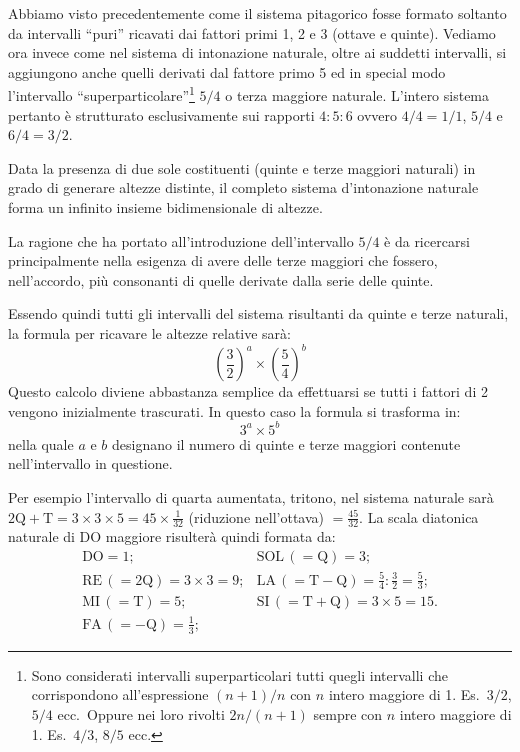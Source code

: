 Abbiamo visto precedentemente come il sistema pitagorico fosse formato
soltanto da intervalli ``puri'' ricavati dai fattori primi 1, 2 e 3 (ottave e
quinte). Vediamo ora invece come nel sistema di intonazione naturale, oltre ai
suddetti intervalli, si aggiungono anche quelli derivati dal fattore primo 5
ed in special modo l'intervallo ``superparticolare''\footnote{\label{nota:superpart}Sono
considerati intervalli superparticolari tutti quegli intervalli che
corrispondono all'espressione $(n+1)/n$ con $n$ intero maggiore di 1.
Es.\ $3/2$, $5/4$ ecc.\ Oppure nei loro rivolti $2n/(n+1)$ sempre con $n$
intero maggiore di 1. Es.\ $4/3$, $8/5$ ecc.} $5/4$ o terza maggiore naturale.
L'intero sistema pertanto è strutturato esclusivamente sui rapporti $4:5:6$
ovvero $4/4 = 1/1$, $5/4$ e $6/4 = 3/2$.

Data la presenza di due sole costituenti (quinte e terze maggiori naturali) in
grado di generare altezze distinte, il completo sistema d'intonazione naturale
forma un infinito insieme bidimensionale di altezze.

La ragione che ha portato all'introduzione dell'intervallo $5/4$ è da
ricercarsi principalmente nella esigenza di avere delle terze maggiori che
fossero, nell'accordo, più consonanti di quelle derivate dalla serie delle
quinte.

Essendo quindi tutti gli intervalli del sistema risultanti da quinte e terze
naturali, la formula per ricavare le altezze relative sarà:
\[
  \left(\frac{3}{2}\right)^{a} \times \left(\frac{5}{4}\right)^{b}
\]
Questo calcolo diviene abbastanza semplice da effettuarsi se tutti i fattori di
2 vengono inizialmente trascurati. In questo caso la formula si trasforma in:
\[
  3^{a} \times 5^{b}
\]
nella quale $a$ e $b$ designano il numero di quinte e terze maggiori contenute
nell'intervallo in questione.

Per esempio l'intervallo di quarta aumentata, tritono, nel sistema naturale
sarà $2\text{Q}+\text{T} = 3\times3\times5 = 45 \times \frac{1}{32}$ (riduzione
nell'ottava) $= \frac{45}{32}$. La scala diatonica naturale di DO maggiore
risulterà quindi formata da:
\[
  \begin{array}{ll}
    \text{DO}=1; & \text{SOL}\,(=\text{Q})=3; \\[3pt]
    \text{RE}\,(=2\text{Q})=3\times3=9; & \text{LA}\,(=\text{T}-\text{Q})=\tfrac{5}{4}:\tfrac{3}{2}=\tfrac{5}{3}; \\[3pt]
    \text{MI}\,(=\text{T})=5; & \text{SI}\,(=\text{T}+\text{Q})=3\times5=15. \\[3pt]
    \text{FA}\,(=-\text{Q})=\tfrac{1}{3}; &
  \end{array}
\]

